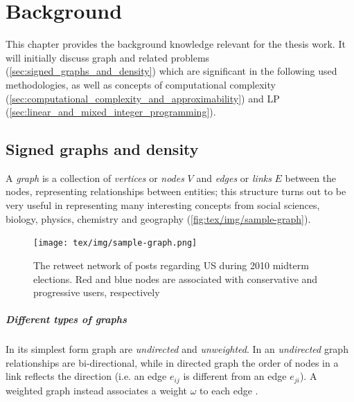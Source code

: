 \chapter{Background}
\label{ch:background}

This chapter provides the background knowledge relevant for the thesis work. It
will initially discuss graph and related problems (\autoref{sec:signed_graphs_and_density}) which are significant in the
following used methodologies, as well as concepts of computational complexity
(\autoref{sec:computational_complexity_and_approximability}) and \acrlong{LP} (\autoref{sec:linear_and_mixed_integer_programming}).

\section{Signed graphs and density}%
\label{sec:signed_graphs_and_density}

A \emph{graph} is a collection of \emph{vertices} or \emph{nodes} $V$ and
\emph{edges} or \emph{links} $E$ between the nodes, representing relationships
between entities; this structure turns out to be very useful in
representing many interesting concepts from social sciences, biology, physics,
chemistry and geography (\autoref{fig:tex/img/sample-graph})\cite{Newman2018}\cite{Menczer2020}.

\begin{figure}
	\centering
	\texttt{[image: tex/img/sample-graph.png]}
	\caption[Retweet network during 2010 midterm elections]{The retweet network of posts regarding US during 2010 midterm
		elections. Red and blue nodes are associated with conservative and
		progressive users, respectively \cite{Menczer2020}}%
	\label{fig:tex/img/sample-graph}
\end{figure}

\paragraph{Different types of graphs}%
\label{par:different_types_of_graphs}

In its simplest form graph are \emph{undirected} and \emph{unweighted}. In an
\emph{undirected} graph relationships are bi-directional, while in directed graph
the order of nodes in a link reflects the
direction (i.e. an edge $e_{ij} $ is different from an edge $e_{ji} $). A weighted
graph instead associates a weight $\omega $ to each edge
\cite{Menczer2020}\cite{AlbertLaszloNortheasternUniversity2016}.

